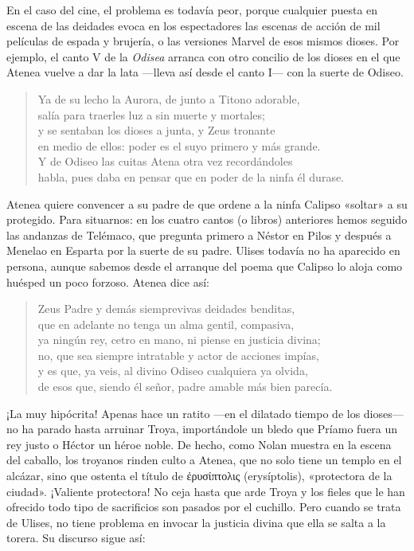 \documentclass[11pt,a4paper]{article}
\newcommand{\gr}[1]{\foreignlanguage{greek}{#1}}
\begin{document}
En el caso del cine, el problema es todavía peor, porque cualquier puesta en escena de las deidades evoca en los espectadores las escenas de acción de mil películas de espada y brujería, o las versiones Marvel de esos mismos dioses.
Por ejemplo, el canto V de la \emph{Odisea} arranca con otro concilio de los dioses en el que Atenea vuelve a dar la lata ---lleva así desde el canto I--- con la suerte de Odiseo.

\begin{verse}
Ya de su lecho la Aurora, de junto a Titono adorable,\\
salía para traerles luz a sin muerte y mortales;\\
y se sentaban los dioses a junta, y Zeus tronante\\
en medio de ellos: poder es el suyo primero y más grande.\\
Y de Odiseo las cuitas Atena otra vez recordándoles\\
habla, pues daba en pensar que en poder de la ninfa él durase.
\end{verse}

Atenea quiere convencer a su padre de que ordene a la ninfa Calipso «soltar» a su protegido. Para situarnos: en los cuatro cantos (o libros) anteriores hemos seguido las andanzas de Telémaco, que pregunta primero a Néstor en Pilos y después a Menelao en Esparta por la suerte de su padre. Ulises todavía no ha aparecido en persona, aunque sabemos desde el arranque del poema que Calipso lo aloja como huésped un poco forzoso. Atenea dice así:

\begin{verse}
Zeus Padre y demás siemprevivas deidades benditas,\\
que en adelante no tenga un alma gentil, compasiva,\\
ya ningún rey, cetro en mano, ni piense en justicia divina;\\
no, que sea siempre intratable y actor de acciones impías,\\
y es que, ya veis, al divino Odiseo cualquiera ya olvida,\\
de esos que, siendo él señor, padre amable más bien parecía.
\end{verse}

¡La muy hipócrita! Apenas hace un ratito ---en el dilatado tiempo de los dioses--- no ha parado hasta arruinar Troya, importándole un bledo que Príamo fuera un rey justo o Héctor un héroe noble. De hecho, como Nolan muestra en la escena del caballo, los troyanos rinden culto a Atenea, que no solo tiene un templo en el alcázar, sino que ostenta el título de \gr{ἐρυσίπτολις} (erysíptolis), «protectora de la ciudad». ¡Valiente protectora! No ceja hasta que arde Troya y los fieles que le han ofrecido todo tipo de sacrificios son pasados por el cuchillo. Pero cuando se trata de Ulises, no tiene problema en invocar la justicia divina que ella se salta a la torera. Su discurso sigue así:
\end{document}
